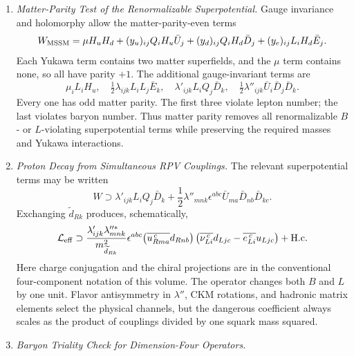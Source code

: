 
\begin{enumerate}
  \begin{enumerate}
    \item \emph{Matter-Parity Test of the Renormalizable Superpotential.}
    Gauge invariance and holomorphy allow the matter-parity-even terms
      \[
        W_{\rm MSSM}
          =\mu H_uH_d
           +(y_u)_{ij}Q_iH_u\bar U_j
           +(y_d)_{ij}Q_iH_d\bar D_j
           +(y_e)_{ij}L_iH_d\bar E_j .
      \]
      Each Yukawa term contains two matter superfields, and the \(\mu\) term
      contains none, so all have parity \(+1\).  The additional
      gauge-invariant terms are
      \[
        \mu_iL_iH_u,\quad
        \tfrac12\lambda_{ijk}L_iL_j\bar E_k,\quad
        \lambda'_{ijk}L_iQ_j\bar D_k,\quad
        \tfrac12\lambda''_{ijk}\bar U_i\bar D_j\bar D_k .
      \]
      Every one has odd matter parity.  The first three violate lepton
      number; the last violates baryon number.  Thus matter parity removes
      all renormalizable \(B\)- or \(L\)-violating superpotential terms while
      preserving the required masses and Yukawa interactions.
    \item \emph{Proton Decay from Simultaneous RPV Couplings.}
    The relevant superpotential terms may be written
      \[
        W\supset
          \lambda'_{ijk}L_iQ_j\bar D_k
          +\frac12\lambda''_{mnk}
            \epsilon^{abc}\bar U_{ma}\bar D_{nb}\bar D_{kc}.
      \]
      Exchanging \(\widetilde d_{Rk}\) produces, schematically,
      \[
        \mathcal L_{\rm eff}\supset
          \frac{\lambda'_{ijk}\lambda_{mnk}^{\prime\prime *}}
               {m_{\widetilde d_{Rk}}^2}
          \epsilon^{abc}
          \bigl(\overline{u_{Rm a}^{\,c}}d_{Rn b}\bigr)
          \left(
            \overline{\nu_{Li}^{\,c}}d_{Lj c}
            -\overline{e_{Li}^{\,c}}u_{Lj c}
          \right)+\mathrm{H.c.}
      \]
      Here charge conjugation and the chiral projections are in the
      conventional four-component notation of this volume.  The operator
      changes both \(B\) and \(L\) by one unit.  Flavor
      antisymmetry in \(\lambda''\), CKM rotations, and hadronic matrix
      elements select the physical channels, but the dangerous coefficient
      always scales as the product of couplings divided by one squark mass
      squared.
    \item \emph{Baryon Triality Check for Dimension-Four Operators.}

\end{enumerate}
\end{enumerate}
